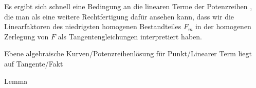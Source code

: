 Es ergibt sich schnell eine Bedingung an die linearen Terme der Potenzreihen
 {} {,}
die man als eine weitere Rechtfertigung dafür ansehen kann, dass wir die Linearfaktoren des niedrigsten homogenen Bestandteiles $F_m$ in der homogenen Zerlegung von $F$ als Tangentengleichungen interpretiert haben.



{Ebene algebraische Kurven/Potenzreihenlösung für Punkt/Linearer Term liegt auf Tangente/Fakt}

{Lemma}

{}

{


\faktsituation {}

}
